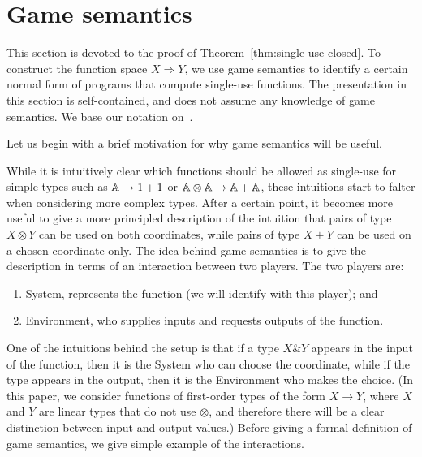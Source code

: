 \newcommand{\invar}[1]{#1_{\mathrm{in}}}
\newcommand{\outvar}[1]{#1_{\mathrm{out}}}

\section{Game semantics}
\label{sec:game-semantics}

This section is devoted to the proof of Theorem~\ref{thm:single-use-closed}. To construct the function space $X \Rightarrow Y$, we use game semantics to identify a certain normal form of programs that compute single-use functions. The presentation in this section is self-contained, and does not assume any knowledge of game semantics. We base our notation on~\cite{abramsky2013semantics}.

Let us begin with a brief motivation for why game semantics will be useful.

While it is intuitively clear which functions should be allowed as single-use for simple types such as $\mathbb A \to 1+1$ or $\mathbb A \otimes \mathbb A \to \mathbb A + \mathbb A$, these intuitions start to falter when considering more complex types. After a certain point, it becomes more useful to give a more principled description of the intuition that pairs of type $X \otimes Y$ can be used on both coordinates, while pairs of type $X + Y$ can be used on a chosen coordinate only. The idea behind game semantics is to give the description in terms of an interaction between two players.  The two players are:
\begin{enumerate}
    \item System, represents the function (we will identify with this player); and
    \item Environment, who supplies inputs and requests outputs of the function.
\end{enumerate}
One of the intuitions behind the setup is that if a type $X \& Y$ appears in the input of the function, then it is the System who can choose the coordinate, while if the type appears in the output, then it is the Environment who makes the choice. (In this paper, we consider functions of first-order types of the form $X \to Y$, where $X$ and $Y$ are linear types that do not use $\otimes$, and therefore there will be a clear distinction between input and output values.)
Before giving a formal definition of game semantics, we give simple example of the interactions.

